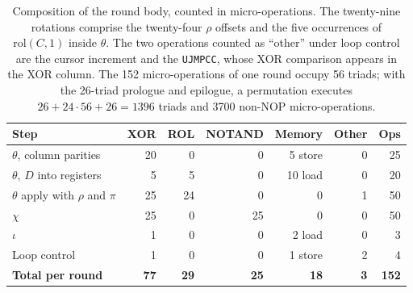 \documentclass[journal=tches,submission]{iacrtrans}
\newcommand{\code}[1]{\texttt{#1}}
\begin{document}
\begin{table}[htbp]
\centering
\small
\begin{tabular}{@{}lrrrrrr@{}}
\toprule
\textbf{Step} & \textbf{XOR} & \textbf{ROL} & \textbf{NOTAND} & \textbf{Memory} & \textbf{Other} & \textbf{Ops} \\
\midrule
$\theta$, column parities        & 20 &  0 &  0 & 5 store & 0 & 25 \\
$\theta$, $D$ into registers     &  5 &  5 &  0 & 10 load & 0 & 20 \\
$\theta$ apply with $\rho$ and $\pi$ & 25 & 24 &  0 & 0 & 1 & 50 \\
$\chi$                           & 25 &  0 & 25 & 0 & 0 & 50 \\
$\iota$                          &  1 &  0 &  0 & 2 load & 0 &  3 \\
Loop control                     &  1 &  0 &  0 & 1 store & 2 &  4 \\
\midrule
\textbf{Total per round}         & \textbf{77} & \textbf{29} & \textbf{25} & \textbf{18} & \textbf{3} & \textbf{152} \\
\bottomrule
\end{tabular}
\caption{Composition of the round body, counted in micro-operations. The
twenty-nine rotations comprise the twenty-four $\rho$ offsets and the five
occurrences of $\mathrm{rol}(C,1)$ inside $\theta$. The two operations counted
as ``other'' under loop control are the cursor increment and the \code{UJMPCC},
whose XOR comparison appears in the XOR column. The 152 micro-operations of one
round occupy 56 triads; with the 26-triad prologue and epilogue, a permutation
executes $26+24\cdot56+26=1396$ triads and 3700 non-NOP micro-operations.}
\label{tab:roundmix}
\end{table}
\end{document}
